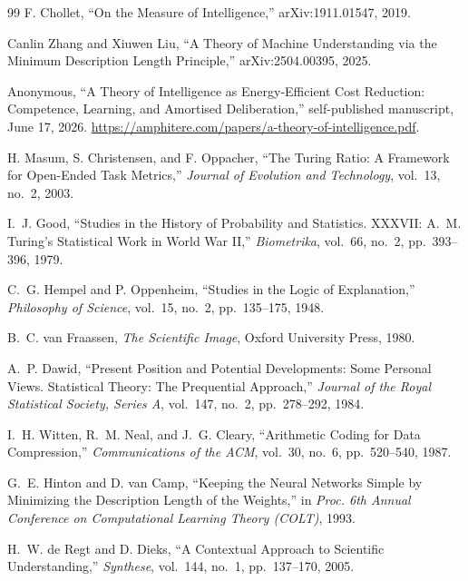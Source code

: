 \documentclass[11pt]{article}
\begin{document}
\begin{thebibliography}{99}
F. Chollet,
\newblock ``On the Measure of Intelligence,''
\newblock arXiv:1911.01547, 2019.

Canlin Zhang and Xiuwen Liu,
\newblock ``A Theory of Machine Understanding via the Minimum Description Length Principle,''
\newblock arXiv:2504.00395, 2025.

Anonymous,
\newblock ``A Theory of Intelligence as Energy-Efficient Cost Reduction: Competence, Learning, and Amortised Deliberation,''
\newblock self-published manuscript, June 17, 2026.
\newblock \url{https://amphitere.com/papers/a-theory-of-intelligence.pdf}.

H. Masum, S. Christensen, and F. Oppacher,
\newblock ``The Turing Ratio: A Framework for Open-Ended Task Metrics,''
\newblock \emph{Journal of Evolution and Technology}, vol.~13, no.~2, 2003.

I.~J. Good,
\newblock ``Studies in the History of Probability and Statistics. XXXVII: A.~M. Turing's Statistical Work in World War II,''
\newblock \emph{Biometrika}, vol.~66, no.~2, pp.~393--396, 1979.

C.~G. Hempel and P. Oppenheim,
\newblock ``Studies in the Logic of Explanation,''
\newblock \emph{Philosophy of Science}, vol.~15, no.~2, pp.~135--175, 1948.

B.~C. van Fraassen,
\newblock \emph{The Scientific Image},
\newblock Oxford University Press, 1980.

A.~P. Dawid,
\newblock ``Present Position and Potential Developments: Some Personal Views. Statistical Theory: The Prequential Approach,''
\newblock \emph{Journal of the Royal Statistical Society, Series A}, vol.~147, no.~2, pp.~278--292, 1984.

I.~H. Witten, R.~M. Neal, and J.~G. Cleary,
\newblock ``Arithmetic Coding for Data Compression,''
\newblock \emph{Communications of the ACM}, vol.~30, no.~6, pp.~520--540, 1987.

G.~E. Hinton and D. van Camp,
\newblock ``Keeping the Neural Networks Simple by Minimizing the Description Length of the Weights,''
\newblock in \emph{Proc. 6th Annual Conference on Computational Learning Theory (COLT)}, 1993.

H.~W. de Regt and D. Dieks,
\newblock ``A Contextual Approach to Scientific Understanding,''
\newblock \emph{Synthese}, vol.~144, no.~1, pp.~137--170, 2005.


\end{thebibliography}
\end{document}
